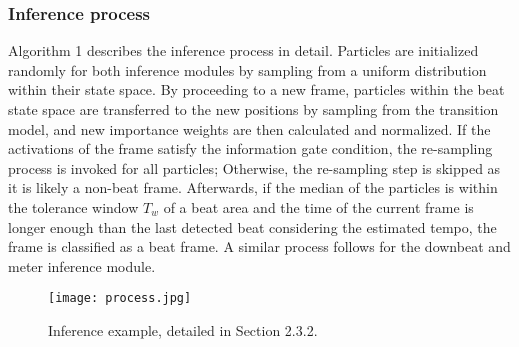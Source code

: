 \documentclass{article}
\begin{document}
\subsubsection{Inference process}
Algorithm 1 describes the inference process in detail. Particles are initialized randomly for both inference modules by sampling from a uniform distribution within their state space. By proceeding to a new frame, particles within the beat state space are transferred to the new positions by sampling from the transition model, and new importance weights are then calculated and normalized. If the activations of the frame satisfy the information gate condition, the re-sampling process is invoked for all particles; Otherwise, the re-sampling step is skipped as it is likely a non-beat frame. Afterwards, if the median of the particles is within the tolerance window $T_{w}$ of a beat area and the time of the current frame is longer enough than the last detected beat considering the estimated tempo, the frame is classified as a beat frame. A similar process follows for the downbeat and meter inference module. 

\begin{figure}[htbp]
 \centerline{
 \texttt{[image: process.jpg]}}
 \caption{Inference example, detailed in Section 2.3.2.}
 \label{fig2}
\end{figure}
\end{document}
